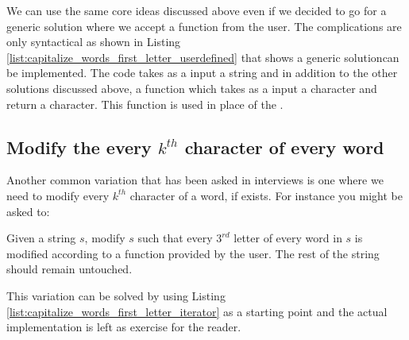 We can use the same core ideas discussed above even if we decided to go for a generic solution where we accept a function from the user. The complications are only syntactical as shown in 
Listing \ref{list:capitalize_words_first_letter_userdefined} that shows a generic solutioncan be implemented. The code takes as a input a string and in addition to the other solutions discussed above, a function  which takes as a input a character and return a character. This function is used in place of the .




\subsection{Modify the every $k^{th}$ character of every word}
Another common variation that has been asked in interviews is one where we need to modify every $k^{th}$ character of a word, if exists. For instance you might be asked to:

\begin{exercise}
Given a string $s$, modify $s$ such that every $3^{rd}$ letter of every word in $s$ is modified according to a function provided by the user. The rest of the string should remain untouched.
\end{exercise}

This variation can be solved by using Listing \ref{list:capitalize_words_first_letter_iterator} as a starting point and the actual implementation is left as exercise for the reader.


